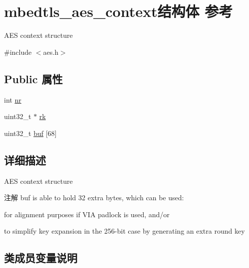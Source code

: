 \hypertarget{structmbedtls__aes__context}{}\section{mbedtls\+\_\+aes\+\_\+context结构体 参考}
\label{structmbedtls__aes__context}


A\+ES context structure  




{\ttfamily \#include $<$aes.\+h$>$}

\subsection*{Public 属性}
\begin{DoxyCompactItemize}
\item 
int \hyperlink{structmbedtls__aes__context_ad0b4f626fa3881c76f23a9a96812b69a}{nr}
\item 
uint32\+\_\+t $\ast$ \hyperlink{structmbedtls__aes__context_ac7e235e5b270daba3635f5e39949b7a4}{rk}
\item 
uint32\+\_\+t \hyperlink{structmbedtls__aes__context_ad9a8f020a5028732e2cf3c8e07b39795}{buf} \mbox{[}68\mbox{]}
\end{DoxyCompactItemize}


\subsection{详细描述}
A\+ES context structure 

\begin{DoxyNote}{注解}
buf is able to hold 32 extra bytes, which can be used\+:
\begin{DoxyItemize}
\item for alignment purposes if V\+IA padlock is used, and/or
\item to simplify key expansion in the 256-\/bit case by generating an extra round key 
\end{DoxyItemize}
\end{DoxyNote}


\subsection{类成员变量说明}
\mbox{\label{structmbedtls__aes__context_ad9a8f020a5028732e2cf3c8e07b39795}} 
